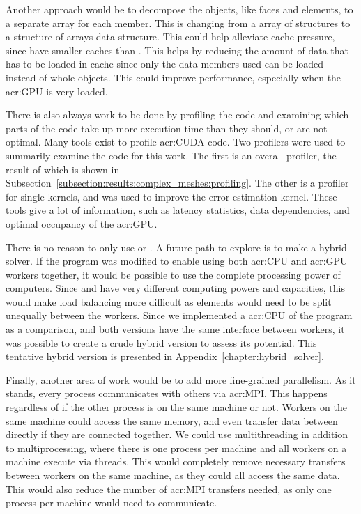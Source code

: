 Another approach would be to decompose the objects, like faces and elements, to a separate array for
each member. This is changing from a array of structures to a structure of arrays data structure.
This could help alleviate cache pressure, since  have smaller caches than
. This helps by reducing the amount of data that has to be loaded in cache since
only the data members used can be loaded instead of whole objects. This could improve performance,
especially when the \acrshort{acr:GPU} is very loaded.

There is also always work to be done by profiling the code and examining which parts of the code
take up more execution time than they should, or are not optimal. Many tools exist to profile
\acrshort{acr:CUDA} code. Two profilers were used to summarily examine the code for this work. The
first is an overall profiler, the result of which is shown in
Subsection~\ref{subsection:results:complex_meshes:profiling}. The other is a profiler for single
kernels, and was used to improve the error estimation kernel. These tools give a lot of information,
such as latency statistics, data dependencies, and optimal occupancy of the \acrshort{acr:GPU}.

There is no reason to only use  or . A future path to
explore is to make a hybrid solver. If the program was modified to enable using both
\acrshort{acr:CPU} and \acrshort{acr:GPU} workers together, it would be possible to use the complete
processing power of computers. Since  and  have very
different computing powers and capacities, this would make load balancing more difficult as elements
would need to be split unequally between the workers. Since we implemented a \acrshort{acr:CPU} of
the program as a comparison, and both versions have the same interface between workers, it was
possible to create a crude hybrid version to assess its potential. This tentative hybrid version is
presented in Appendix~\ref{chapter:hybrid_solver}.

Finally, another area of work would be to add more fine-grained parallelism. As it stands, every
process communicates with others via \acrshort{acr:MPI}. This happens regardless of if
the other process is on the same machine or not. Workers on the same machine could access the same
memory, and even transfer data between  directly if they are connected together.
We could use multithreading in addition to multiprocessing, where there is one process per machine
and all workers on a machine execute via threads. This would completely remove necessary transfers
between workers on the same machine, as they could all access the same data. This would also reduce
the number of \acrshort{acr:MPI} transfers needed, as only one process per machine would need to
communicate.

